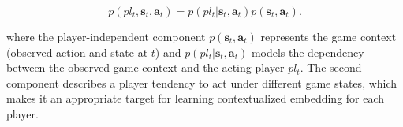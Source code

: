 \documentclass[letterpaper]{article} %
\newcommand{\generation}{p}
\newcommand{\state}{\mathbf{s}}
\newcommand{\action}{\mathbf{a}}
\newcommand{\reward}{r}
\newcommand{\goal}{g}
\newcommand{\player}{pl}
\newcommand{\home}{\it{Home}}
\newcommand{\away}{\it{Away}}
\newcommand{\none}{\it{Neither}}
\newcommand{\features}{\mathbf{x}}
\begin{document}
\begin{equation}
    \label{eq:player-factor} 
    \generation(\player_{t}, \state_{t}, \action_{t}) = \generation(\player_{t}|\state_{t},\action_{t}) \generation(\state_{t},\action_{t}).
\end{equation}

\noindent where the player-independent component $\generation(\state_{t},\action_{t})$ represents the game context (observed action and state at $t$) and $\generation(\player_{t}|\state_{t},\action_{t})$ models the dependency between the observed game context and the acting player $\player_{t}$.
The second component describes a player tendency to act under different game states, which makes it an appropriate target for learning contextualized embedding for each player. 

\end{document}
